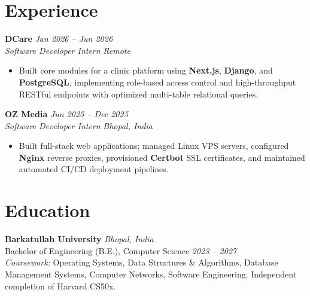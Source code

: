 \documentclass[10pt,a4paper]{article}
\begin{document}
\section{Experience}
\textbf{DCare} \hfill \textit{Jan 2026 -- Jun 2026} \\
\textit{Software Developer Intern} \hfill \textit{Remote}
\begin{itemize}
    \item Built core modules for a clinic platform using \textbf{Next.js}, \textbf{Django}, and \textbf{PostgreSQL}, implementing role-based access control and high-throughput RESTful endpoints with optimized multi-table relational queries.
\end{itemize}

\textbf{OZ Media} \hfill \textit{Jun 2025 -- Dec 2025} \\
\textit{Software Developer Intern} \hfill \textit{Bhopal, India}
\begin{itemize}
    \item Built full-stack web applications; managed Linux VPS servers, configured \textbf{Nginx} reverse proxies, provisioned \textbf{Certbot} SSL certificates, and maintained automated CI/CD deployment pipelines.
\end{itemize}

\section{Education}
\textbf{Barkatullah University} \hfill \textit{Bhopal, India} \\
Bachelor of Engineering (B.E.), Computer Science \hfill \textit{2023 -- 2027} \\
\textit{Coursework:} Operating Systems, Data Structures \& Algorithms, Database Management Systems, Computer Networks, Software Engineering. Independent completion of Harvard CS50x.
\end{document}
